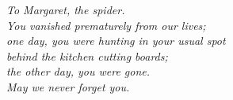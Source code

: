 {
\noindent
\raggedleft
\emph{To Margaret, the spider.\\You vanished prematurely from our lives;\\one day, you were hunting in your usual spot\\behind the kitchen cutting boards;\\the other day, you were gone.\\[0.5em]May we never forget you.}\\
\vfill
{}
\clearpage
}